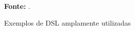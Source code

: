 \begin{figure}[ht!]
\centering

\caption{\textmd{Exemplos de DSL amplamente utilizadas}}
\label{fig:exemplosdsl}

\par\medskip\textbf{Fonte:} . \par\medskip
\end{figure}
